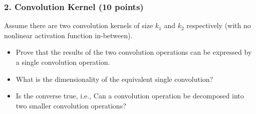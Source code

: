 \documentclass[12pt]{article}%
\begin{document}
    \newpage


    \subsubsection*{2. Convolution Kernel (10 points)}
    Assume there are two convolution kernels of size
    $k_1$ and $k_2$ respectively (with no nonlinear activation function in-between).
    \begin{itemize}
        \item Prove that the results of the two convolution operations can be expressed by a single convolution operation.
        \item What is the dimensionality of the equivalent single convolution?
        \item Is the converse true, i.e.,
        Can a convolution operation be decomposed into two smaller convolution operations?
    \end{itemize}
\end{document}
